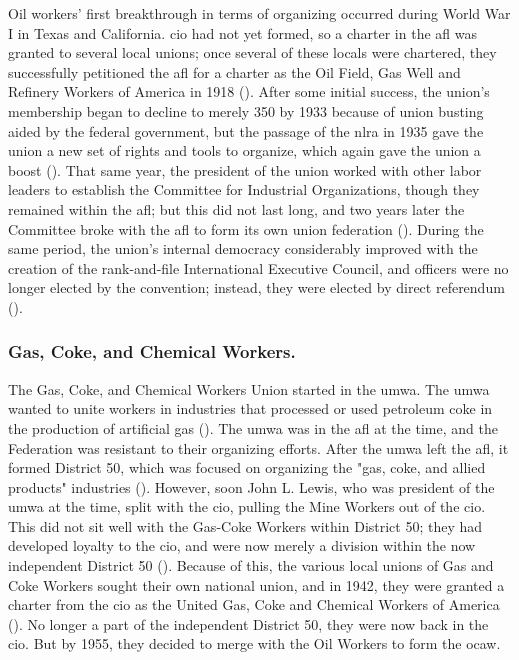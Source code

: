 \documentclass[12pt]{article}
\begin{document}
Oil workers’ first breakthrough in terms of organizing occurred during World War I in Texas and California. \acrfull{cio} had not yet formed, so a charter in the \acrfull{afl} was granted to several local unions; once several of these locals were chartered, they successfully petitioned the \acrshort{afl} for a charter as the Oil Field, Gas Well and Refinery Workers of America in 1918 (\cite[48]{ocawFactBookOil1960}). After some initial success, the union’s membership began to decline to merely 350 by 1933 because of union busting aided by the federal government, but the passage of the \acrfull{nlra} in 1935 gave the union a new set of rights and tools to organize, which again gave the union a boost (\cite[49]{ocawFactBookOil1960}). That same year, the president of the union worked with other labor leaders to establish the Committee for Industrial Organizations, though they remained within the \acrshort{afl}; but this did not last long, and two years later the Committee broke with the \acrshort{afl} to form its own union federation (\cite[49]{ocawFactBookOil1960}). During the same period, the union’s internal democracy considerably improved with the creation of the rank-and-file International Executive Council, and officers were no longer elected by the convention; instead, they were elected by direct referendum (\cite[49--50]{ocawFactBookOil1960}).

\subsubsection{Gas, Coke, and Chemical Workers.}

The Gas, Coke, and Chemical Workers Union started in the \acrfull{umwa}. The \acrshort{umwa} wanted to unite workers in industries that processed or used petroleum coke in the production of artificial gas (\cite[50]{ocawFactBookOil1960}). The \acrshort{umwa} was in the \acrshort{afl} at the time, and the Federation was resistant to their organizing efforts. After the \acrshort{umwa} left the \acrshort{afl}, it formed District 50, which was focused on organizing the "gas, coke, and allied products" industries (\cite[50--51]{ocawFactBookOil1960}). However, soon John L. Lewis, who was president of the \acrshort{umwa} at the time, split with the \acrshort{cio}, pulling the Mine Workers out of the \acrshort{cio}. This did not sit well with the Gas-Coke Workers within District 50; they had developed loyalty to the \acrshort{cio}, and were now merely a division within the now independent District 50 (\cite[51]{ocawFactBookOil1960}). Because of this, the various local unions of Gas and Coke Workers sought their own national union, and in 1942, they were granted a charter from the \acrshort{cio} as the United Gas, Coke and Chemical Workers of America (\cite[51]{ocawFactBookOil1960}). No longer a part of the independent District 50, they were now back in the \acrshort{cio}. But by 1955, they decided to merge with the Oil Workers to form the \acrfull{ocaw}.
\end{document}
